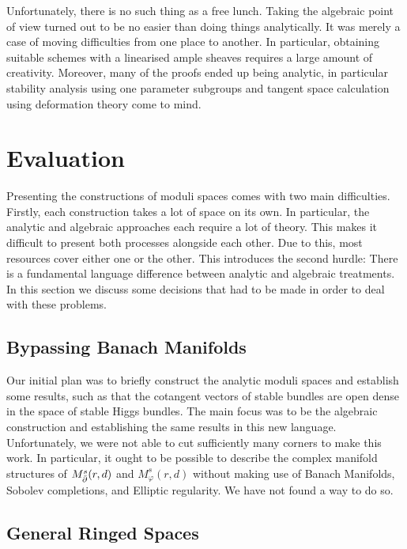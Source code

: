 \documentclass[12pt]{ociamthesis}  %
\begin{document}
Unfortunately, there is no such thing as a free lunch. \cite{friedman1977}
Taking the algebraic point of view turned out to be no easier than
doing things analytically. It was merely a case of moving difficulties
from one place to another. In particular, obtaining suitable schemes with
a linearised ample sheaves requires a large amount of creativity.
Moreover, many of the proofs ended up being analytic, in particular
stability analysis using one parameter subgroups
and tangent space calculation using deformation theory come to mind.

\section{Evaluation}

Presenting the constructions of moduli spaces comes with two main
difficulties. Firstly, each construction takes a lot of space on its
own. In particular, the analytic and algebraic approaches each
require a lot of theory. This makes it difficult to present both
processes alongside each other. Due to this, most resources cover
either one or the other. This introduces the second hurdle: There is a
fundamental language difference between analytic and algebraic treatments.
In this section we discuss some decisions that had to be made in
order to deal with these problems.

\subsection{Bypassing Banach Manifolds}

Our initial plan was to briefly construct the analytic moduli spaces
and establish some results, such as that the cotangent vectors of
stable bundles are open dense in the space of stable Higgs bundles.
The main focus was to be the algebraic construction and establishing the
same results in this new language. Unfortunately, we were not able to
cut sufficiently many corners to make this work. In particular,
it ought to be possible to describe the complex
manifold structures of $M^s_{\bar{\partial}}(r,d)$ and $M^s_\varphi(r,d)$
without making use of Banach Manifolds, Sobolev completions, and
Elliptic regularity. We have not found a way to do so.

\subsection{General Ringed Spaces}
\end{document}
